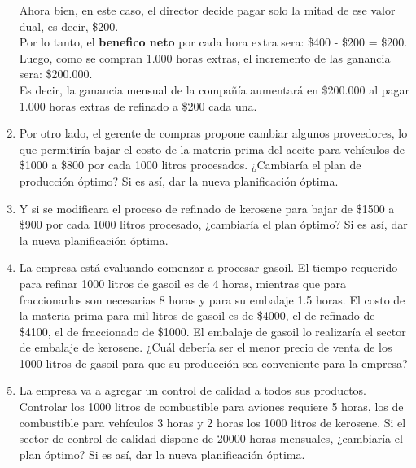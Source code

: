 \documentclass[10pt,a4paper]{article}
\begin{document}
\begin{enumerate}
    Ahora bien, en este caso, el director decide pagar solo la mitad de ese valor dual, es decir, \$200.\\
    Por lo tanto, el \textbf{benefico neto} por cada hora extra sera: \$400 - \$200 = \$200. \\
    Luego, como se compran 1.000 horas extras, el incremento de las ganancia sera: \$200.000.\\

    Es decir, la ganancia mensual de la compañía aumentará en \$200.000 al pagar 1.000 horas extras de refinado a \$200 cada una.

    \item Por otro lado, el gerente de compras propone cambiar algunos proveedores, lo que permitiría bajar el costo
    de la materia prima del aceite para vehículos de \$1000 a \$800 por cada 1000 litros procesados. ¿Cambiaría el
    plan de producción óptimo? Si es así, dar la nueva planificación óptima.

    \item Y si se modificara el proceso de refinado de kerosene para bajar de \$1500 a \$900 por cada 1000 litros procesado,
    ¿cambiaría el plan óptimo? Si es así, dar la nueva planificación óptima.
    
    \item La empresa está evaluando comenzar a procesar gasoil. El tiempo requerido para refinar 1000 litros de gasoil
    es de 4 horas, mientras que para fraccionarlos son necesarias 8 horas y para su embalaje 1.5 horas. El costo
    de la materia prima para mil litros de gasoil es de \$4000, el de refinado de \$4100, el de fraccionado de \$1000.
    El embalaje de gasoil lo realizaría el sector de embalaje de kerosene. ¿Cuál debería ser el menor precio de
    venta de los 1000 litros de gasoil para que su producción sea conveniente para la empresa?
    
    \item La empresa va a agregar un control de calidad a todos sus productos. Controlar los 1000 litros de combustible
    para aviones requiere 5 horas, los de combustible para vehículos 3 horas y 2 horas los 1000 litros de kerosene.
    Si el sector de control de calidad dispone de 20000 horas mensuales, ¿cambiaría el plan óptimo? Si es así, dar
    la nueva planificación óptima.

\end{enumerate}

\clearpage
\end{document}
